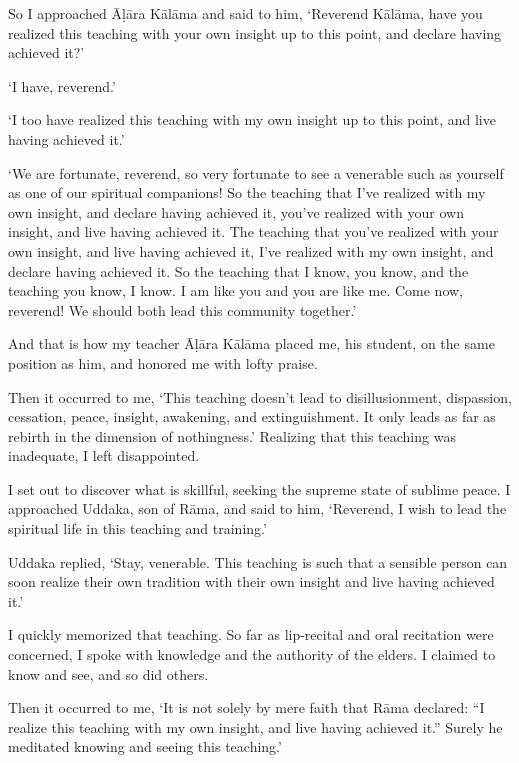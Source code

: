 \documentclass[12pt,openany]{book}%
\begin{document}
So I approached \textsanskrit{Āḷāra} \textsanskrit{Kālāma} and said to him, ‘Reverend \textsanskrit{Kālāma}, have you realized this teaching with your own insight up to this point, and declare having achieved it?’ 

‘I have, reverend.’ 

‘I too have realized this teaching with my own insight up to this point, and live having achieved it.’ 

‘We are fortunate, reverend, so very fortunate to see a venerable such as yourself as one of our spiritual companions! So the teaching that I’ve realized with my own insight, and declare having achieved it, you’ve realized with your own insight, and live having achieved it. The teaching that you’ve realized with your own insight, and live having achieved it, I’ve realized with my own insight, and declare having achieved it. So the teaching that I know, you know, and the teaching you know, I know. I am like you and you are like me. Come now, reverend! We should both lead this community together.’ 

And that is how my teacher \textsanskrit{Āḷāra} \textsanskrit{Kālāma} placed me, his student, on the same position as him, and honored me with lofty praise. 

Then it occurred to me, ‘This teaching doesn’t lead to disillusionment, dispassion, cessation, peace, insight, awakening, and extinguishment. It only leads as far as rebirth in the dimension of nothingness.’ Realizing that this teaching was inadequate, I left disappointed. 

I set out to discover what is skillful, seeking the supreme state of sublime peace. I approached Uddaka, son of \textsanskrit{Rāma}, and said to him, ‘Reverend, I wish to lead the spiritual life in this teaching and training.’ 

Uddaka replied, ‘Stay, venerable. This teaching is such that a sensible person can soon realize their own tradition with their own insight and live having achieved it.’ 

I quickly memorized that teaching. So far as lip-recital and oral recitation were concerned, I spoke with knowledge and the authority of the elders. I claimed to know and see, and so did others. 

Then it occurred to me, ‘It is not solely by mere faith that \textsanskrit{Rāma} declared: “I realize this teaching with my own insight, and live having achieved it.” Surely he meditated knowing and seeing this teaching.’ 
\end{document}
